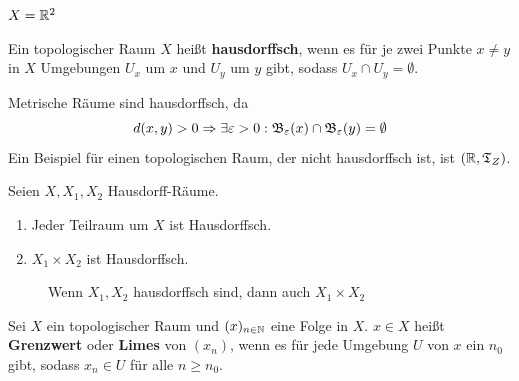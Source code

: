 \begin{beispiel} 
    $X = \mathbb{R}^2$ 

    
\end{beispiel}

\begin{definition} 
    Ein topologischer Raum $X$ heißt \textbf{hausdorffsch}, wenn es
    für je zwei Punkte $x \neq y$ in $X$ Umgebungen $U_x$ um $x$
    und $U_y$ um $y$ gibt, sodass $U_x \cap U_y = \emptyset$.
\end{definition}

\begin{bemerkung}[Trennungseigenschaft]\label{Trennungseigenschaft}
    Metrische Räume sind hausdorffsch, da 
    \[d(x,y) > 0 \Rightarrow \exists \varepsilon > 0: \mathfrak{B}_\varepsilon(x) \cap \mathfrak{B}_\varepsilon(y) = \emptyset\]
    Ein Beispiel für einen topologischen Raum, der nicht hausdorffsch ist,
    ist $(\mathbb{R}, \mathfrak{T}_Z)$.
\end{bemerkung}

\begin{bemerkung}
    Seien $X, X_1, X_2$ Hausdorff-Räume.
    \begin{enumerate}[label=\alph*)]
        \item Jeder Teilraum um $X$ ist Hausdorffsch.
        \item $X_1 \times X_2$ ist Hausdorffsch.
    \end{enumerate}
    \begin{figure}[htp]
        \centering
        
        \caption{Wenn $X_1, X_2$ hausdorffsch sind, dann auch $X_1 \times X_2$}
    \end{figure}
\end{bemerkung}

\begin{definition}  
    Sei $X$ ein topologischer Raum und $(x)_{n \in \mathbb{N}}$ eine Folge
    in $X$. $x \in X$ heißt \textbf{Grenzwert} oder \textbf{Limes}
    von $(x_n)$, wenn es für jede Umgebung $U$ von $x$ ein $n_0$ gibt,
    sodass $x_n \in U$ für alle $n \geq n_0$.
\end{definition}

